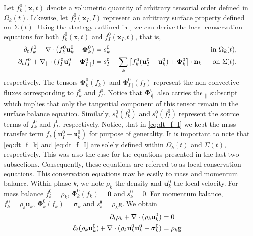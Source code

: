 Let $f_k^0(\textbf{x},t)$ denote a volumetric quantity of arbitrary tensorial order defined in $\Omega_k(t)$.
Likewise, let $f_I^0(\textbf{x}_I,I)$ represent an arbitrary surface property defined on $\Sigma(t)$.
Using the strategy outlined in \citep{bothe2022sharp,morel2015mathematical,slattery2007interfacial}, we can derive the local conservation equations for both $f_k^0(\textbf{x},t)$ and $f_I^0(\textbf{x}_I,t)$, that is,  
\begin{align}
    \label{eq:dt_f_k}
    \partial_t f_k^0
    +\mathbf{\nabla}\cdot \left(
        f_k^0\textbf{u}_k^0
        - \mathbf{\Phi}_k^0
        \right)
    &= 
    s_k^0
    & \text{ in } \Omega_k(t),&\\
    \partial_t f_I^0 
    +\mathbf{\nabla}_{||}\cdot
    (
        f_I^0 \textbf{u}_I^0
        - \mathbf{\Phi}_{I||}^0 
    )
    &= 
    s_I^0
    - \sum_k \left[
    f_k^0 (\textbf{u}_I^0 - \textbf{u}_k^0)
    + \mathbf{\Phi}_k^0
    \right] \cdot \textbf{n}_k 
    & \text{ on } \Sigma(t),&
    \label{eq:dt_f_I}
\end{align}
respectively.
The tensors $\mathbf{\Phi}_k^0(f_k)$ and $\mathbf{\Phi}_{I||}^0(f_I)$ represent the non-convective fluxes corresponding to $f_k^0$ and $f_I^0$. 
Notice that $\mathbf{\Phi}_{I||}^0$ also carries the $_{||}$ subscript which implies that only the tangential component of this tensor remain in the surface balance equation. 
Similarly, $s_k^0(f_k^0)$ and $s_I^0(f_I^0)$ represent the source terms of $f_k^0$ and $f_I^0$, respectively.
Notice, that in \ref{eq:dt_f_I} we kept the mass transfer term $f_k (\textbf{u}_I^0 - \textbf{u}_k^0)$ for purpose of generality. 
It is important to note that \ref{eq:dt_f_k} and \ref{eq:dt_f_I} are solely defined within $\Omega_k(t)$ and $\Sigma(t)$, respectively.
This was also the case for the equations presented in the last two subsections. 
Consequently, these equations are referred to as local conservation equations. This conservation equations may be easily to mass and momentum balance. %
Within phase $k$, we note $\rho_k$ the density and $\textbf{u}_k^0$ the local velocity. For mass balance $f_k^0 = \rho_k$, $\mathbf{\Phi}_k^0(f_k) = \mathbf{0}$ and $s_k^0=0$. For momentum balance, $f_k^0 = \rho_k \mathbf{u}_k$, $\mathbf{\Phi}_k^0(f_k) = \boldsymbol{\sigma}_k$ and $s_k^0 = \rho _k \mathbf{g}$. We obtain %
\begin{align}
    \label{eq:dt_rho}
    \pddt \rho_k  
    + \div (
        \rho_k\textbf{u}_k^0
    )
    &= 
    0\\
    \label{eq:dt_rhou_k}
    \pddt (\rho_k\textbf{u}_k^0)  
    + \div (
        \rho_k\textbf{u}_k^0\textbf{u}_k^0
        - \bm{\sigma}_k^0 
    )
    &= 
    \rho_k \textbf{g}%
\end{align} 

